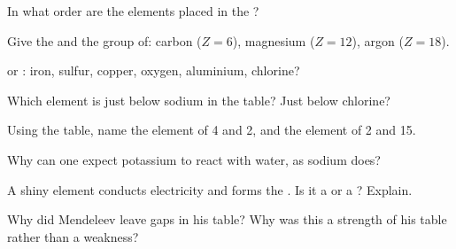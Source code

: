 \begin{exercise}[$\star$]\label{exo:g9:periodic-table-first-look:1}
In what order are the elements placed in the ?
\end{exercise}

\begin{exercise}[$\star$]\label{exo:g9:periodic-table-first-look:2}
Give the  and the group of: carbon ($Z = 6$), magnesium ($Z = 12$),
argon ($Z = 18$).
\end{exercise}

\begin{exercise}[$\star$]\label{exo:g9:periodic-table-first-look:3}
 or : iron, sulfur, copper, oxygen, aluminium, chlorine?
\end{exercise}

\begin{exercise}[$\star$]\label{exo:g9:periodic-table-first-look:4}
Which element is just below sodium in the table? Just below chlorine?
\end{exercise}

\begin{exercise}[$\star\star$]\label{exo:g9:periodic-table-first-look:5}
Using the table, name the element of  4 and  2, and the
element of  2 and  15.
\end{exercise}

\begin{exercise}[$\star\star$]\label{exo:g9:periodic-table-first-look:6}
Why can one expect potassium to react with water, as sodium does?
\end{exercise}

\begin{exercise}[$\star\star$]\label{exo:g9:periodic-table-first-look:7}
A shiny element conducts electricity and forms the  . Is it
a  or a ? Explain.
\end{exercise}

\begin{exercise}[$\star\star$]\label{exo:g9:periodic-table-first-look:8}
Why did Mendeleev leave gaps in his table? Why was this a strength of his
table rather than a weakness?
\end{exercise}

